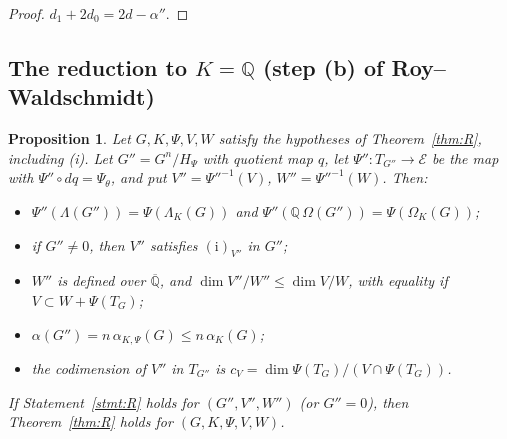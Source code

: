 \documentclass[11pt]{amsart}
\newtheorem{proposition}[theorem]{Proposition}
\theoremstyle{definition}
\newcommand{\Qb}{\overline{\mathbb{Q}}}
\newcommand{\Q}{\mathbb{Q}}
\newcommand{\cE}{\mathcal{E}}
\begin{document}
\begin{proof}
$d_1+2d_0=2d-\alpha''$.
\end{proof}

\subsection{The reduction to $K=\Q$ (step (b) of Roy--Waldschmidt)}\label{sec:stepb}

\begin{proposition}\label{prop:stepb}
Let $G,K,\Psi,V,W$ satisfy the hypotheses of Theorem~\ref{thm:R}, including (i). Let $G''=G^n/H_\Psi$ with quotient map
$q$, let $\Psi''\colon T_{G''}\to\cE$ be the map with $\Psi''\circ dq=\Psi_\theta$, and put $V''=\Psi''^{-1}(V)$,
$W''=\Psi''^{-1}(W)$. Then:
\begin{itemize}
\item[(a)] $\Psi''(\Lambda(G''))=\Psi(\Lambda_K(G))$ and $\Psi''(\Q\,\Omega(G''))=\Psi(\Omega_K(G))$;
\item[(b)] if $G''\ne0$, then $V''$ satisfies $(\mathrm i)_{V''}$ in $G''$;
\item[(c)] $W''$ is defined over $\Qb$, and $\dim V''/W''\le\dim V/W$, with equality if $V\subset W+\Psi(T_G)$;
\item[(d)] $\alpha(G'')=n\,\alpha_{K,\Psi}(G)\le n\,\alpha_K(G)$;
\item[(e)] the codimension of $V''$ in $T_{G''}$ is $c_V=\dim\Psi(T_G)/(V\cap\Psi(T_G))$.
\end{itemize}
If Statement~\ref{stmt:R} holds for $(G'',V'',W'')$ (or $G''=0$), then Theorem~\ref{thm:R} holds for $(G,K,\Psi,V,W)$.
\end{proposition}
\end{document}
